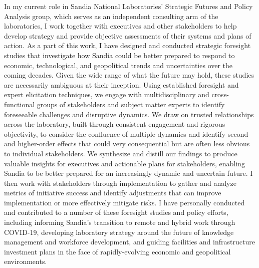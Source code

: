 \documentclass[10pt]{article}
\begin{document}
In my current role in Sandia National Laboratories' Strategic Futures and Policy Analysis group, which serves as an independent consulting arm of the laboratories, I work together with executives and other stakeholders to help develop strategy and provide objective assessments of their systems and plans of action. As a part of this work, I have designed and conducted strategic foresight studies that investigate how Sandia could be better prepared to respond to economic, technological, and geopolitical trends and uncertainties over the coming decades. Given the wide range of what the future may hold, these studies are necessarily ambiguous at their inception. Using established foresight and expert elicitation techniques, we engage with multidisciplinary and cross-functional groups of stakeholders and subject matter experts to identify foreseeable challenges and disruptive dynamics. We draw on trusted relationships across the laboratory, built through consistent engagement and rigorous objectivity, to consider the confluence of multiple dynamics and identify second- and higher-order effects that could very consequential but are often less obvious to individual stakeholders. We synthesize and distill our findings to produce valuable insights for executives and actionable plans for stakeholders, enabling Sandia to be better prepared for an increasingly dynamic and uncertain future. I then work with stakeholders through implementation to gather and analyze metrics of initiative success and identify adjustments that can improve implementation or more effectively mitigate risks. I have personally conducted and contributed to a number of these foresight studies and policy efforts, including informing Sandia's transition to remote and hybrid work through COVID-19, developing laboratory strategy around the future of knowledge management and workforce development, and guiding facilities and infrastructure investment plans in the face of rapidly-evolving economic and geopolitical environments.
\end{document}
